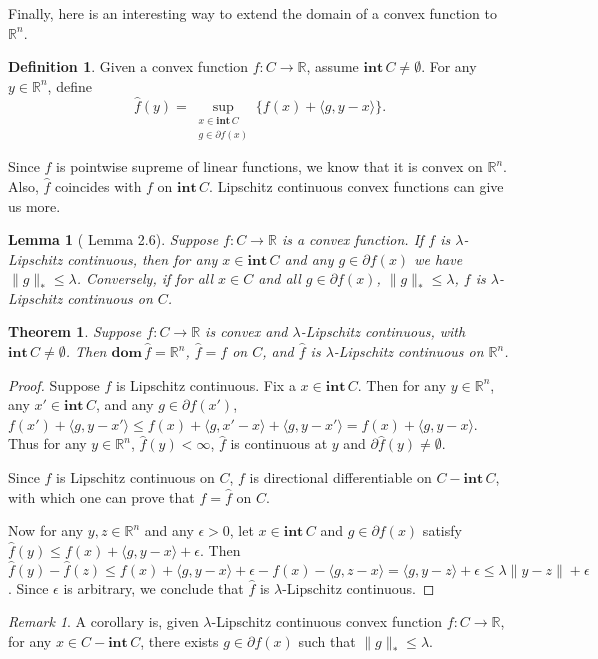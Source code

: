 \documentclass[openany]{book}
\newtheorem{lemma}{Lemma}[chapter]
\newtheorem{theorem}{Theorem}[chapter]
\theoremstyle{definition}
\newtheorem{definition}{Definition}[chapter]
\theoremstyle{remark}
\newtheorem*{remark}{Remark}
\begin{document}
Finally, here is an interesting way to extend the domain of a convex function to $\mathbb{R}^n$.
\begin{definition}
    Given a convex function $f:C\to \mathbb{R}$, assume $\mathbf{int}\,C\ne\emptyset$. For any $y\in \mathbb{R}^n$, define
    \begin{equation}
        \hat{f}(y)=\sup_{\substack{x\in \mathbf{int}\,C \\ g\in\partial f(x)}}\{f(x)+\langle g,y-x\rangle\}.
    \end{equation}
\end{definition}
Since $\hat{f}$ is pointwise supreme of linear functions, we know that it is convex on $\mathbb{R}^n$. Also, $\hat{f}$ coincides with $f$ on $\mathbf{int}\,C$. Lipschitz continuous convex functions can give us more.
\begin{lemma}[\cite{S11} Lemma 2.6]
    Suppose $f:C\to \mathbb{R}$ is a convex function. If $f$ is $\lambda$-Lipschitz continuous, then for any $x\in \mathbf{int}\,C$ and any $g\in\partial f(x)$ we have $\|g\|_*\le\lambda$. Conversely, if for all $x\in C$ and all $g\in\partial f(x)$, $\|g\|_*\le\lambda$, $f$ is $\lambda$-Lipschitz continuous on $C$.
\end{lemma}
\begin{theorem}
    Suppose $f:C\to \mathbb{R}$ is convex and $\lambda$-Lipschitz continuous, with $\mathbf{int}\,C\ne\emptyset$. Then $\mathbf{dom}\,\hat{f}=\mathbb{R}^n$, $\hat{f}=f$ on $C$, and $\hat{f}$ is $\lambda$-Lipschitz continuous on $\mathbb{R}^n$.
\end{theorem}
\begin{proof}
    Suppose $f$ is Lipschitz continuous. Fix a $x\in \mathbf{int}\,C$. Then for any $y\in \mathbb{R}^n$, any $x'\in \mathbf{int}\,C$, and any $g\in\partial f(x')$, $f(x')+\langle g,y-x'\rangle\le f(x)+\langle g,x'-x\rangle+\langle g,y-x'\rangle=f(x)+\langle g,y-x\rangle$. Thus for any $y\in \mathbb{R}^n$, $\hat{f}(y)<\infty$, $\hat{f}$ is continuous at $y$ and $\partial\hat{f}(y)\ne\emptyset$.

    Since $f$ is Lipschitz continuous on $C$, $f$ is directional differentiable on $C-\mathbf{int}\,C$, with which one can prove that $f=\hat{f}$ on $C$.

    Now for any $y,z\in \mathbb{R}^n$ and any $\epsilon>0$, let $x\in \mathbf{int}\,C$ and $g\in\partial f(x)$ satisfy $\hat{f}(y)\le f(x)+\langle g,y-x\rangle+\epsilon$. Then $\hat{f}(y)-\hat{f}(z)\le f(x)+\langle g,y-x\rangle+\epsilon-f(x)-\langle g,z-x\rangle=\langle g,y-z\rangle+\epsilon\le\lambda\|y-z\|+\epsilon$. Since $\epsilon$ is arbitrary, we conclude that $\hat{f}$ is $\lambda$-Lipschitz continuous.
\end{proof}
\begin{remark}
    A corollary is, given $\lambda$-Lipschitz continuous convex function $f:C\to \mathbb{R}$, for any $x\in C-\mathbf{int}\,C$, there exists $g\in\partial f(x)$ such that $\|g\|_*\le\lambda$.
\end{remark}
\end{document}
